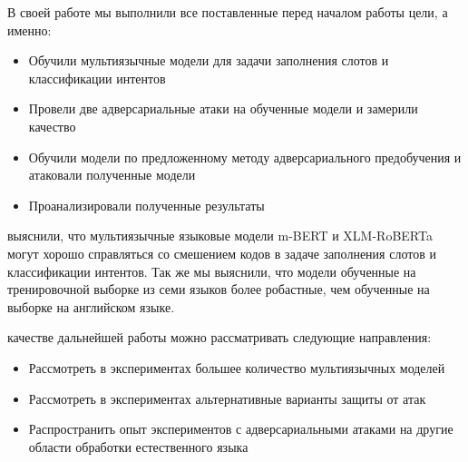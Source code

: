 В своей работе мы выполнили все поставленные перед началом работы цели, а именно:

\begin{itemize}
    \item Обучили мультиязычные модели для задачи заполнения слотов и классификации интентов
    \item Провели две адверсариальные атаки на обученные модели и замерили качество
    \item Обучили модели по предложенному методу адверсариального предобучения и атаковали полученные модели
    \item Проанализировали полученные результаты
\end{itemize}

 выяснили, что мультиязычные языковые модели m-BERT и XLM-RoBERTa могут хорошо справляться со смешением кодов в задаче заполнения слотов и классификации интентов.
Так же мы выяснили, что модели обученные на тренировочной выборке из семи языков более робастные, чем обученные на выборке на английском языке.

 качестве дальнейшей работы можно рассматривать следующие направления:

\begin{itemize}
    \item Рассмотреть в экспериментах большее количество мультиязычных моделей
    \item Рассмотреть в экспериментах альтернативные варианты защиты от атак
    \item Распространить опыт экспериментов с адверсариальными атаками на другие области обработки естественного языка
\end{itemize}
